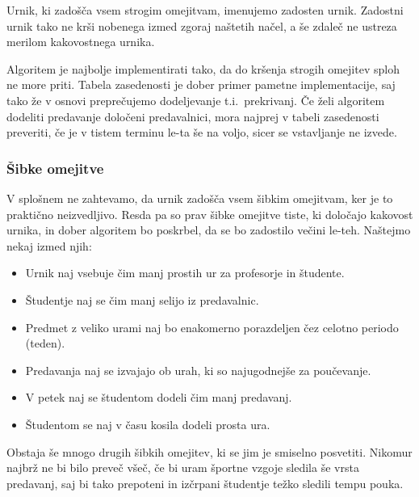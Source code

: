 \documentclass[10pt, a4paper]{article}
\begin{document}
\noindent Urnik, ki zadošča vsem strogim omejitvam, imenujemo zadosten urnik. Zadostni urnik tako ne
krši nobenega izmed zgoraj naštetih načel, a še zdaleč ne ustreza merilom kakovostnega urnika.

Algoritem je najbolje implementirati tako, da do kršenja strogih omejitev sploh ne more priti.
Tabela zasedenosti je dober primer pametne implementacije, saj tako že v osnovi  preprečujemo
dodeljevanje t.i.~prekrivanj. Če želi algoritem dodeliti predavanje določeni predavalnici,
mora najprej v tabeli zasedenosti preveriti, če je v tistem terminu le-ta še na voljo,
sicer se vstavljanje ne izvede.

\subsubsection{Šibke omejitve}

V splošnem ne zahtevamo, da urnik zadošča vsem šibkim omejitvam, ker je to praktično neizvedljivo.
Resda pa so prav šibke omejitve tiste, ki določajo kakovost urnika, in dober algoritem bo
poskrbel, da se bo zadostilo večini le-teh. Naštejmo nekaj izmed njih:

\begin{itemize}
   \item Urnik naj vsebuje čim manj prostih ur za profesorje in študente.
   \item Študentje naj se čim manj selijo iz predavalnic.
   \item Predmet z veliko urami naj bo enakomerno porazdeljen čez celotno periodo (teden).
   \item Predavanja naj se izvajajo ob urah, ki so najugodnejše za poučevanje.
   \item V petek naj se študentom dodeli čim manj predavanj.
   \item Študentom se naj v času kosila dodeli prosta ura.
\end{itemize}

\noindent Obstaja še mnogo drugih šibkih omejitev, ki se jim je smiselno posvetiti. Nikomur najbrž ne
bi bilo preveč všeč, če bi uram športne vzgoje sledila še vrsta predavanj, saj bi tako
prepoteni in izčrpani študentje težko sledili tempu pouka.
\end{document}

